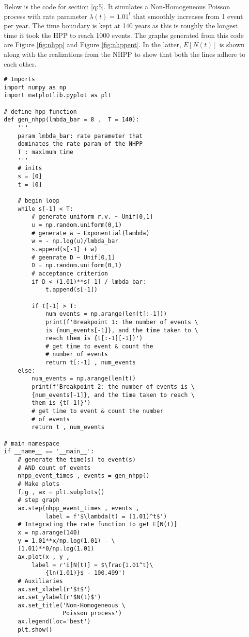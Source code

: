 \documentclass[%
 reprint,
 amsmath,amssymb,
 aps,
]{revtex4-2}
\theoremstyle{definition}
\begin{document}
Below is the code for section \ref{q:5}. It simulates a Non-Homogeneous Poisson process with rate parameter $\lambda(t)=1.01^t$ that smoothly increases from 1 event per year. The time boundary is kept at 140 years as this is roughly the longest time it took the HPP to reach 1000 events. The graphs generated from this code are Figure \ref{fig:nhpp} and Figure \ref{fig:nhppent}. In the latter, $E[N(t)]$ is shown along with the realizations from the NHPP to show that both the lines adhere to each other.
\begin{verbatim}
# Imports
import numpy as np
import matplotlib.pyplot as plt

# define hpp function
def gen_nhpp(lmbda_bar = 8 ,  T = 140):
    '''
    param lmbda_bar: rate parameter that 
    dominates the rate param of the NHPP
    T : maximum time
    '''
    # inits
    s = [0]
    t = [0]

    # begin loop
    while s[-1] < T:
        # generate uniform r.v. ~ Unif[0,1]
        u = np.random.uniform(0,1)
        # generate w ~ Exponential(lambda) 
        w = - np.log(u)/lmbda_bar 
        s.append(s[-1] + w)
        # geenrate D ~ Unif[0,1]
        D = np.random.uniform(0,1)
        # acceptance criterion
        if D < (1.01)**s[-1] / lmbda_bar:
            t.append(s[-1])
        
        if t[-1] > T:
            num_events = np.arange(len(t[:-1]))
            print(f'Breakpoint 1: the number of events \
            is {num_events[-1]}, and the time taken to \
            reach them is {t[:-1][-1]}')
            # get time to event & count the 
            # number of events
            return t[:-1] , num_events
    else:
        num_events = np.arange(len(t))
        print(f'Breakpoint 2: the number of events is \
        {num_events[-1]}, and the time taken to reach \
        them is {t[-1]}')
        # get time to event & count the number 
        # of events
        return t , num_events

# main namespace
if __name__ == '__main__': 
    # generate the time(s) to event(s) 
    # AND count of events
    nhpp_event_times , events = gen_nhpp() 
    # Make plots
    fig , ax = plt.subplots()
    # step graph
    ax.step(nhpp_event_times , events , 
            label = f'$\lambda(t) = (1.01)^t$') 
    # Integrating the rate function to get E[N(t)]
    x = np.arange(140)
    y = 1.01**x/np.log(1.01) - \
    (1.01)**0/np.log(1.01)
    ax.plot(x , y , 
    	label = r'E[N(t)] = $\frac{1.01^t}\
            {ln(1.01)}$ - 100.499')
    # Auxiliaries
    ax.set_xlabel(r'$t$')
    ax.set_ylabel(r'$N(t)$')
    ax.set_title('Non-Homogeneous \
                 Poisson process')
    ax.legend(loc='best')
    plt.show()

\end{verbatim}

\nocite{*}

\end{document}
